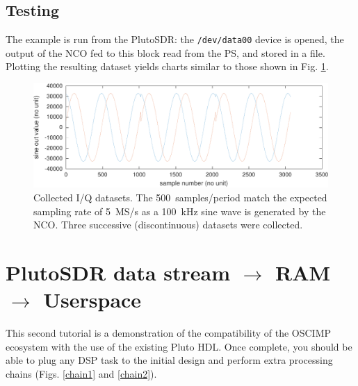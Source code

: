\documentclass{article}
\begin{document}
\subsection{Testing}

The example is run from the PlutoSDR: the {\tt /dev/data00} device is opened, the output
of the NCO fed to this block read from the PS, and stored in a file. Plotting the resulting
dataset yields charts similar to those shown in Fig. \ref{nco}.

\begin{figure}[h!tb]
\includegraphics[width=\linewidth]{NCO.pdf}
\caption{Collected I/Q datasets. The 500~samples/period match the expected sampling
rate of 5~MS/s as a 100~kHz sine wave is generated by the NCO. Three successive (discontinuous)
datasets were collected.}%
\label{nco}
\end{figure}

\section{PlutoSDR data stream $\to$ RAM $\to$ Userspace}
This second tutorial is a demonstration of the compatibility of the OSCIMP
ecosystem with the use of the existing Pluto HDL.
Once complete, you should be able to plug any DSP task to the initial design and
perform extra processing chains (Figs. \ref{chain1} and \ref{chain2}).
\end{document}

